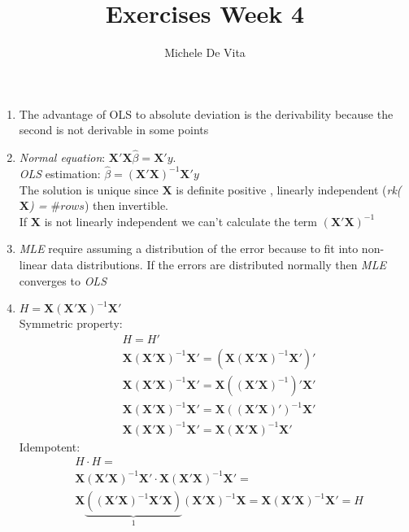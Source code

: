\documentclass[10pt,a4paper]{article}
\begin{document}
	\author{Michele De Vita}
	\title{Exercises Week 4}
	\maketitle
	\begin{enumerate}
		\item The advantage of OLS to absolute deviation is the derivability because the second is not derivable in some points
		\item \textit{Normal equation}: $ \mathbf{X}' \mathbf{X} \hat{\beta} = \mathbf{X}'y $. \\\textit{OLS } estimation: $ \hat{\beta} = (\mathbf{X}' \mathbf{X})^{-1} \mathbf{X}' y $\\
		The solution is unique since $ \mathbf{X} $ is definite positive , linearly independent (\textit{rk($ \mathbf{X} $) = $ \#rows $}) then invertible.\\
		If $ \mathbf{X} $ is not linearly independent we can't calculate the term $ (\mathbf{X}' \mathbf{X})^{-1} $
		\item \textit{MLE} require assuming a distribution of the error because to fit into non-linear data distributions. If the errors are distributed normally then \textit{MLE } converges to \textit{OLS}
		\item $ H = \mathbf{X}(\mathbf{X}'\mathbf{X})^{-1}\mathbf{X}' $\\
		Symmetric property:
		\begin{align*}
			&H = H' \\
			&\mathbf{X}(\mathbf{X}'\mathbf{X})^{-1}\mathbf{X}' = (\mathbf{X}(\mathbf{X}'\mathbf{X})^{-1}\mathbf{X}')' \\
			&\mathbf{X}(\mathbf{X}'\mathbf{X})^{-1}\mathbf{X}' = \mathbf{X}((\mathbf{X}'\mathbf{X})^{-1})'\mathbf{X}'\\
			&\mathbf{X}(\mathbf{X}'\mathbf{X})^{-1}\mathbf{X}' = \mathbf{X}((\mathbf{X}'\mathbf{X})')^{-1}\mathbf{X}'\\
			&\mathbf{X}(\mathbf{X}'\mathbf{X})^{-1}\mathbf{X}' = \mathbf{X}(\mathbf{X}'\mathbf{X})^{-1}\mathbf{X}' 
		\end{align*}
		Idempotent:
		\begin{align*}
			& H \cdot H = \\
			&\mathbf{X}(\mathbf{X}'\mathbf{X})^{-1}\mathbf{X}' \cdot \mathbf{X}(\mathbf{X}'\mathbf{X})^{-1}\mathbf{X}' = \\
			& \mathbf{X}\underbrace{((\mathbf{X}'\mathbf{X})^{-1}\mathbf{X}' \mathbf{X})}_1(\mathbf{X}'\mathbf{X})^{-1}\mathbf{X}= \mathbf{X}(\mathbf{X}'\mathbf{X})^{-1}\mathbf{X}' = H

\end{align*}
\end{enumerate}
\end{document}
